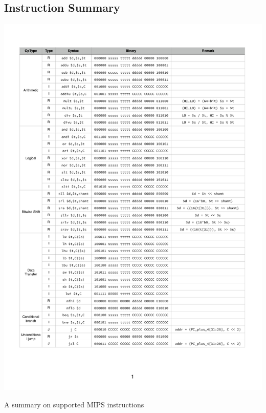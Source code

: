 \documentclass[paper=a4, fontsize=11pt]{scrartcl} %
\numberwithin{equation}{section} %
\numberwithin{figure}{section} %
\numberwithin{table}{section} %
\begin{document}
\begin{spacing}{1.5}
\begin{appendices}
    \section{Instruction Summary}
    	\label{app::inst}
    	\begin{table}[!htb]
    		\centering
    		\includegraphics[width = 14cm]{Instructions}
    		\caption{A summary on supported MIPS instructions}
    	\end{table}
    \newpage

\end{appendices}
\end{spacing}
\end{document}

